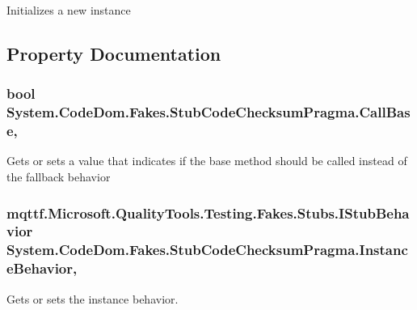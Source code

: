 Initializes a new instance



\subsection{Property Documentation}
\hypertarget{class_system_1_1_code_dom_1_1_fakes_1_1_stub_code_checksum_pragma_a745538411234f3c1e6ff8641ec39c2e3}{
\subsubsection[{Call\-Base}]{\setlength{\rightskip}{0pt plus 5cm}bool System.\-Code\-Dom.\-Fakes.\-Stub\-Code\-Checksum\-Pragma.\-Call\-Base\hspace{0.3cm}{\ttfamily [get]}, {\ttfamily [set]}}}\label{class_system_1_1_code_dom_1_1_fakes_1_1_stub_code_checksum_pragma_a745538411234f3c1e6ff8641ec39c2e3}


Gets or sets a value that indicates if the base method should be called instead of the fallback behavior

\hypertarget{class_system_1_1_code_dom_1_1_fakes_1_1_stub_code_checksum_pragma_a7233e2d8b1ddf9820bc8a73f99877997}{
\subsubsection[{Instance\-Behavior}]{\setlength{\rightskip}{0pt plus 5cm}mqttf.\-Microsoft.\-Quality\-Tools.\-Testing.\-Fakes.\-Stubs.\-I\-Stub\-Behavior System.\-Code\-Dom.\-Fakes.\-Stub\-Code\-Checksum\-Pragma.\-Instance\-Behavior\hspace{0.3cm}{\ttfamily [get]}, {\ttfamily [set]}}}\label{class_system_1_1_code_dom_1_1_fakes_1_1_stub_code_checksum_pragma_a7233e2d8b1ddf9820bc8a73f99877997}


Gets or sets the instance behavior.

